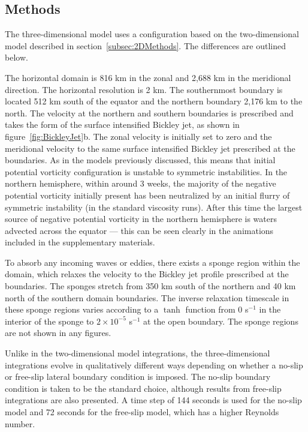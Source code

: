     \subsection{Methods}
    The three-dimensional model uses a configuration based on the two-dimensional model described in section~\ref{subsec:2DMethods}. The differences are outlined below.

    The horizontal domain is 816 km in the zonal and 2,688 km in the meridional direction. The horizontal resolution is 2 km. The southernmost boundary is located 512 km south of the equator and the northern boundary 2,176 km to the north. The velocity at the northern and southern boundaries is prescribed and takes the form of the surface intensified Bickley jet, as shown in figure~\ref{fig:BickleyJet}b. The zonal velocity is initially set to zero and the meridional velocity to the same  surface intensified Bickley jet prescribed at the boundaries. As in the models previously discussed, this means that initial potential vorticity configuration is unstable to symmetric instabilities. In the northern hemisphere, within around 3 weeks, the majority of the negative potential vorticity initially present has been neutralized by an initial flurry of symmetric instability (in the standard viscosity runs). After this time the largest source of negative potential vorticity in the northern hemisphere is waters advected across the equator --- this can be seen clearly in the animations included in the supplementary materials.
    
    To absorb any incoming waves or eddies, there exists a sponge region within the  domain, which relaxes the velocity to the Bickley jet profile prescribed at the boundaries. The sponges stretch from 350 km south of the northern and 40 km north of the southern domain boundaries. The inverse relaxation timescale in these sponge regions varies according to a $\tanh$ function from 0 s$^{-1}$ in the interior of the sponge to $2 \times 10^{-5}$ s$^{-1}$ at the open boundary. The sponge regions are not shown in any figures.

    Unlike in the two-dimensional model integrations, the three-dimensional integrations evolve in qualitatively different ways depending on whether a no-slip or free-slip lateral boundary condition is imposed. The no-slip boundary condition is taken to be the standard choice, although results from free-slip integrations are also presented. A time step of 144 seconds is used for the no-slip model and 72 seconds for the free-slip model, which has a higher Reynolds number.


